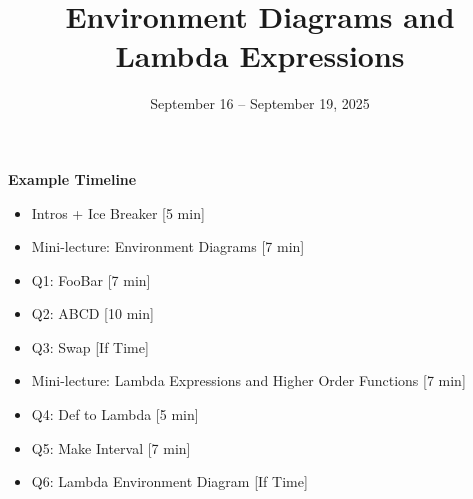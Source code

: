 \documentclass{exam}
\title{Environment Diagrams and Lambda Expressions}
\date{September 16 -- September 19, 2025}
\begin{document}
\maketitle

\begin{meta}
    \textbf{Example Timeline}
    \begin{itemize}
        \item Intros + Ice Breaker [5 min]
        \item Mini-lecture: Environment Diagrams [7 min]
        \item Q1: FooBar [7 min]
        \item Q2: ABCD [10 min]
        \item Q3: Swap [If Time]
        \item Mini-lecture: Lambda Expressions and Higher Order Functions [7 min]
        \item Q4: Def to Lambda [5 min]
        \item Q5: Make Interval [7 min]
        \item Q6: Lambda Environment Diagram [If Time]
            
    \end{itemize}
\end{meta}
\end{document}
